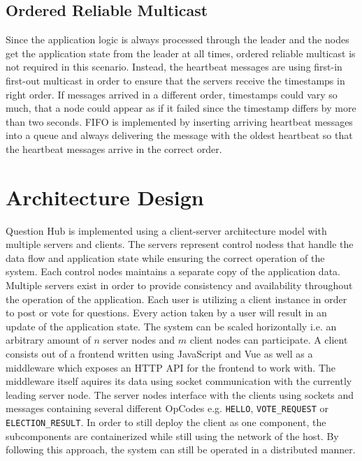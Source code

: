 \documentclass[runningheads]{llncs}
\begin{document}
\subsection{Ordered Reliable Multicast}

Since the application logic is always processed through the leader and the
nodes get the application state from the leader at all times, ordered
reliable multicast is not required in this scenario.
\newline
\newline
Instead, the heartbeat messages are using first-in first-out multicast in order to ensure that the
servers receive the timestamps in right order. If messages arrived in a
different order, timestamps could vary so much, that a node could appear as if
it failed since the timestamp differs by more than two seconds. 
\newline
\newline
FIFO is implemented by inserting arriving heartbeat messages into a queue and
always delivering the message with the oldest heartbeat so that the heartbeat
messages arrive in the correct order.

\section{Architecture Design}

Question Hub is implemented using a client-server \cite{berson1996client} architecture
model with multiple servers and clients. The servers represent control nodess that handle the
data flow and application state while ensuring the correct operation of the system.
Each control nodes maintains a separate copy of the application data. Multiple servers exist
in order to provide consistency and availability throughout the operation of the
application. Each user is utilizing a client instance in order to post or vote for
questions. Every action taken by a user will result in an update of the application state.
\newline
\newline
The system can be scaled horizontally i.e. an arbitrary amount of $n$ server
nodes and $m$ client nodes can participate. A client consists out of a
frontend written using JavaScript and Vue as well as a middleware which exposes
an HTTP API for the frontend to work with. The middleware itself aquires its
data using socket communication with the currently leading server node. The
server nodes interface with the clients using sockets and messages containing
several different OpCodes e.g. \texttt{HELLO}, \texttt{VOTE\_REQUEST} or \texttt{ELECTION\_RESULT}.
In order to still deploy the client as one component, the subcomponents are
containerized while still using the network of the host. By following this
approach, the system can still be operated in a distributed manner. 
\end{document}
